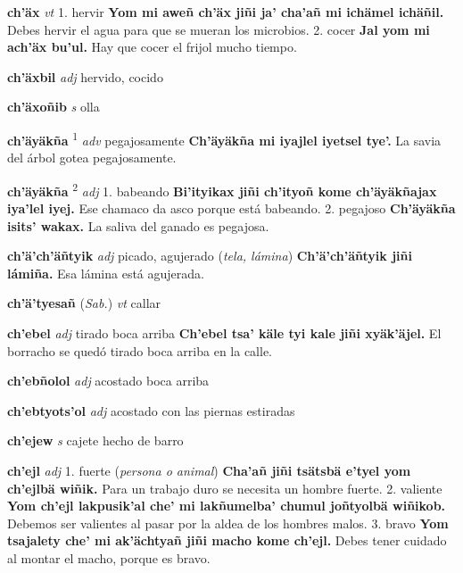 \documentclass[10pt]{scrbook}
\newcommand{\entry}[1]{\textbf{#1}}
\newcommand{\onedefinition}[1]{#1.}
\newcommand{\defsuperscript}[1]{\textsuperscript{#1}}
\newcommand{\partofspeech}[1]{\textit{#1}}
\newcommand{\spanishtranslation}[1]{#1}
\newcommand{\clarification}[1]{(\textit{#1})}
\newcommand{\cholexample}[1]{\textbf{#1}}
\newcommand{\exampletranslation}[1]{#1}
\newcommand{\relevantdialect}[1]{(\textit{#1})}
\begin{document}
\begin{multicols}{2}
\entry{ch'äx}
\partofspeech{vt}
\onedefinition{1}
\spanishtranslation{hervir}
\cholexample{Yom mi aweñ ch'äx jiñi ja' cha'añ mi ichämel ichäñil.}
\exampletranslation{Debes hervir el agua para que se mueran los microbios.}
\onedefinition{2}
\spanishtranslation{cocer}
\cholexample{Jal yom mi ach'äx bu'ul.}
\exampletranslation{Hay que cocer el frijol mucho tiempo.}

\entry{ch'äxbil}
\partofspeech{adj}
\spanishtranslation{hervido, cocido}

\entry{ch'äxoñib}
\partofspeech{s}
\spanishtranslation{olla}

\entry{ch'äyäkña}
\defsuperscript{1}
\partofspeech{adv}
\spanishtranslation{pegajosamente}
\cholexample{Ch'äyäkña mi iyajlel iyetsel tye'.}
\exampletranslation{La savia del árbol gotea pegajosamente.}

\entry{ch'äyäkña}
\defsuperscript{2}
\partofspeech{adj}
\onedefinition{1}
\spanishtranslation{babeando}
\cholexample{Bi'ityikax jiñi ch'ityoñ kome ch'äyäkñajax iya'lel iyej.}
\exampletranslation{Ese chamaco da asco porque está babeando.}
\onedefinition{2}
\spanishtranslation{pegajoso}
\cholexample{Ch'äyäkña isits' wakax.}
\exampletranslation{La saliva del ganado es pegajosa.}

\entry{ch'ä'ch'äñtyik}
\partofspeech{adj}
\spanishtranslation{picado, agujerado}
\clarification{tela, lámina}
\cholexample{Ch'ä'ch'äñtyik jiñi lámiña.}
\exampletranslation{Esa lámina está agujerada.}

\entry{ch'ä'tyesañ}
\relevantdialect{Sab.}
\partofspeech{vt}
\spanishtranslation{callar}

\entry{ch'ebel}
\partofspeech{adj}
\spanishtranslation{tirado boca arriba}
\cholexample{Ch'ebel tsa' käle tyi kale jiñi xyäk'äjel.}
\exampletranslation{El borracho se quedó tirado boca arriba en la calle.}

\entry{ch'ebñolol}
\partofspeech{adj}
\spanishtranslation{acostado boca arriba}

\entry{ch'ebtyots'ol}
\partofspeech{adj}
\spanishtranslation{acostado con las piernas estiradas}

\entry{ch'ejew}
\partofspeech{s}
\spanishtranslation{cajete hecho de barro}

\entry{ch'ejl}
\partofspeech{adj}
\onedefinition{1}
\spanishtranslation{fuerte}
\clarification{persona o animal}
\cholexample{Cha'añ jiñi tsätsbä e'tyel yom ch'ejlbä wiñik.}
\exampletranslation{Para un trabajo duro se necesita un hombre fuerte.}
\onedefinition{2}
\spanishtranslation{valiente}
\cholexample{Yom ch'ejl lakpusik'al che' mi lakñumelba' chumul joñtyolbä wiñikob.}
\exampletranslation{Debemos ser valientes al pasar por la aldea de los hombres malos.}
\onedefinition{3}
\spanishtranslation{bravo}
\cholexample{Yom tsajalety che' mi ak'ächtyañ jiñi macho kome ch'ejl.}
\exampletranslation{Debes tener cuidado al montar el macho, porque es bravo.}


\end{multicols}
\end{document}
